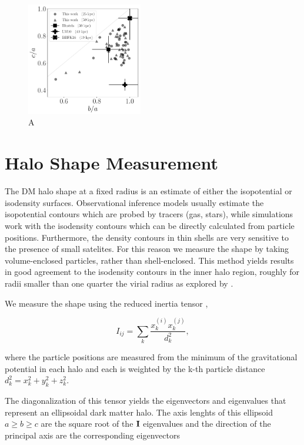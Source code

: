 \documentclass[a4paper,fleqn,usenatbib]{mnras}
\begin{document}
\begin{figure}
\begin{center}
\includegraphics[width=0.45\textwidth]{triaxiality_observations.pdf}
\end{center}
\caption{A}
\label{fig:observations}
\end{figure}


\section{Halo Shape Measurement}


The DM halo shape at a fixed radius is an estimate of either
the isopotential or isodensity surfaces.  
Observational inference models usually estimate the 
isopotential contours which are probed by tracers (gas, stars), while
simulations work with the isodensity contours which can be directly
calculated from particle positions.  
Furthermore, the density contours in thin shells are very sensitive to
the presence of small satelites.  
For this reason we measure the shape by taking
volume-enclosed particles, rather than shell-enclosed.  
This method yields results in good agreement to the isodensity
contours in the inner halo region, roughly for radii smaller than one
quarter the virial radius as explored by
\citep{Vera-Ciro_et_al._2011}. 

We measure the shape using the reduced inertia tensor \citep{Allgood_et_al._2006}, 


\begin{equation}
I_{ij} = \sum_k \frac{x_k^{(i)}x_k^{(j)}}{d^2_k},
\label{eq:inertia}
\end{equation}

where the particle positions are measured from the minimum of the
gravitational potential in each halo and each is weighted by the k-th
particle distance 
$d_k^2=x_k^2+y_k^2+z_k^2$.

The diagonalization of this tensor yields the eigenvectors and
eigenvalues that represent an ellipsoidal dark matter halo.
The axis lenghts of this ellipsoid $a\geq b \geq c$ are the square
root of the ${\bf I}$ eigenvalues and the direction of the principal
axis are the corresponding eigenvectors 
\end{document}
